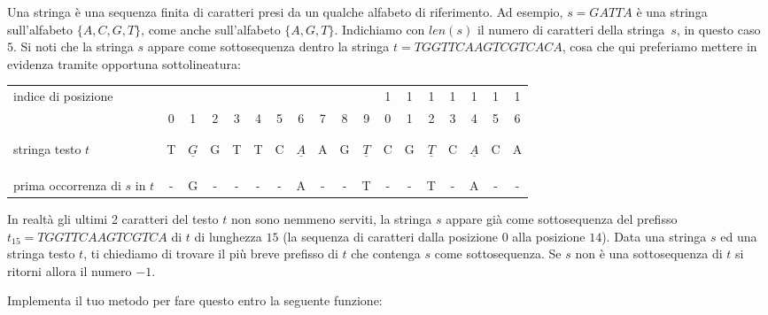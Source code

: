 

\renewcommand{\titolo}{\texttt{Find subsequence}}

\introduzione{}

Una stringa è una sequenza finita di caratteri presi da un qualche alfabeto di riferimento. 
Ad esempio, $s=GATTA$ è una stringa sull'alfabeto $\{A,C,G,T\}$, come anche sull'alfabeto $\{A,G,T\}$.
Indichiamo con $len(s)$ il numero di caratteri della stringa~$s$, in questo caso $5$.
Si noti che la stringa $s$ appare come sottosequenza dentro la stringa $t=TGGTTCAAGTCGTCACA$, 
cosa che qui preferiamo mettere in evidenza tramite opportuna sottolineatura:\\

\renewcommand{\arraystretch}{0.2}
\begin{tabular}{l||c|c|c|c|c|c|c|c|c|c|c|c|c|c|c|c|c|}
  indice di posizione       &  & & & & & & & & & & 1&1&1&1&1&1&1 \\
                            & 0&1&2&3&4&5&6&7&8&9& 0&1&2&3&4&5&6 \\
  \hline
                            &  & & & & & & & & & &  & & & & & &  \\
                            &  & & & & & & & & & &  & & & & & &  \\  
  stringa testo $t$         & T&$\underline{G}$&G&T&T&C&$\underline{A}$&A&G&$\underline{T}$&C&G&$\underline{T}$&C&$\underline{A}$&C&A \\
                            &  & & & & & & & & & &  & & & & & &  \\
                            &  & & & & & & & & & &  & & & & & &  \\
                            &  & & & & & & & & & &  & & & & & &  \\  
  prima occorrenza di $s$ in $t$  &-&G&-&-&-&-&A&-&-&T&-&-&T&-&A&-&- \\  
\end{tabular}  
\renewcommand{\arraystretch}{1.2}  
\bigskip

In realtà gli ultimi 2 caratteri del testo $t$ non sono nemmeno serviti, la stringa 
$s$ appare già come sottosequenza del prefisso $t_{15}=TGGTTCAAGTCGTCA$ di $t$ di 
lunghezza $15$ (la sequenza di caratteri dalla posizione $0$ alla posizione $14$).
Data una stringa $s$ ed una stringa testo $t$, ti chiediamo di trovare il più breve 
prefisso di $t$ che contenga $s$ come sottosequenza.
Se $s$ non è una sottosequenza di $t$ si ritorni allora il numero $-1$.

\bigskip
\noindent
Implementa il tuo metodo per fare questo entro la seguente funzione:

